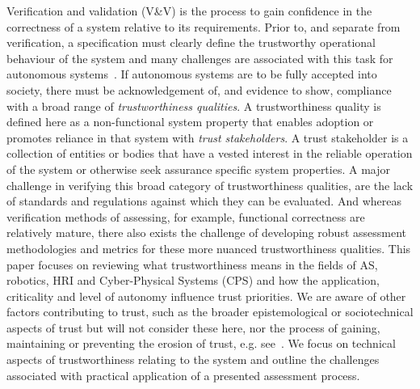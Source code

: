 Verification and validation (V\&V) is the process to gain confidence in the correctness of a system relative to its requirements. Prior to, and separate from verification, a specification must clearly define the trustworthy operational behaviour of the system and many challenges are associated with this task for autonomous systems~\cite{Abeywickrama2022}. 
%
%
If autonomous systems are to be fully accepted into society, there must be acknowledgement of, and evidence to show, compliance with a broad range of \emph{trustworthiness qualities}. 
%
A trustworthiness quality is defined here as a non-functional system property that enables adoption or promotes reliance in that system with \emph{trust stakeholders}. A trust stakeholder is a collection of entities or bodies that have a vested interest in the reliable operation of the system or otherwise seek assurance specific system properties. 
% 
A major challenge in verifying this broad category of trustworthiness qualities, are the lack of standards and regulations against which they can be evaluated. And whereas verification methods of assessing, for example, functional correctness are relatively mature, there also exists the challenge of developing robust assessment methodologies and metrics for these more nuanced trustworthiness qualities. 
%
%
This paper focuses on reviewing what trustworthiness means in the fields of AS, robotics, HRI and Cyber-Physical Systems (CPS) and how the application, criticality and level of autonomy influence trust priorities. 
%
We are aware of other factors contributing to trust, such as the broader epistemological or sociotechnical aspects of trust but will not consider these here, nor the process of gaining, maintaining or preventing the erosion of trust, e.g. see~\cite{Chiou2021}. We focus on technical aspects of trustworthiness relating to the system and outline the challenges associated with practical application of a presented assessment process. 


